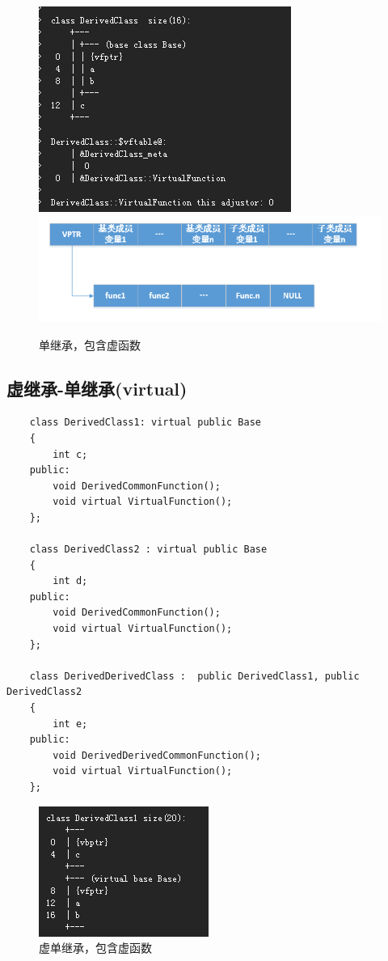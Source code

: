 \documentclass[UTF8,a4paper,12pt]{ctexbook} %
\begin{document}
		    \begin{figure}[H]
		      \centering
		      \includegraphics[scale = 0.8]{figure/singleDerivedVirutal.png}
		      \includegraphics[scale = 0.8]{vtable1.png}
		      \caption{单继承，包含虚函数}
		    \end{figure}  	

		\newpage
		\subsection{虚继承-单继承(virtual)}
			\begin{lstlisting}
	class DerivedClass1: virtual public Base
	{
		int c;
	public:
		void DerivedCommonFunction();
		void virtual VirtualFunction();
	};
	
	class DerivedClass2 : virtual public Base
	{
		int d;
	public:
		void DerivedCommonFunction();
		void virtual VirtualFunction();
	};
	
	class DerivedDerivedClass :  public DerivedClass1, public DerivedClass2
	{
		int e;
	public:
		void DerivedDerivedCommonFunction();
		void virtual VirtualFunction();
	};
			\end{lstlisting}
		
		\begin{figure}[H]
			\centering
			\includegraphics[scale = 0.8]{figure/virtualDerivedVirutal.png}
			\caption{虚单继承，包含虚函数}
		\end{figure}
\end{document}
